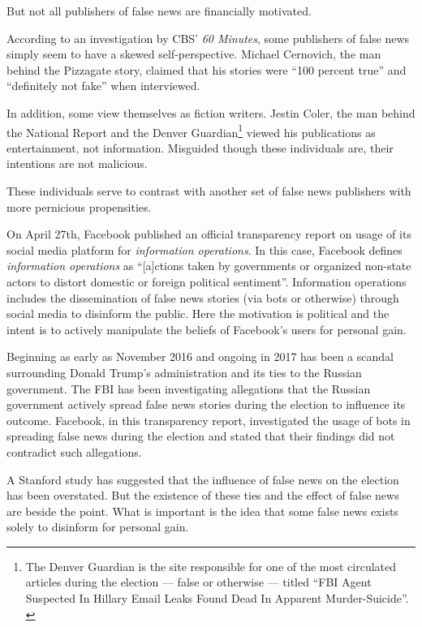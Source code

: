 \par But not all publishers of false news are financially motivated.
\par According to an investigation by CBS' \emph{60 Minutes}, some publishers of false news simply seem to have a skewed self-perspective. Michael Cernovich, the man behind the Pizzagate story, claimed that his stories were ``100 percent true'' and ``definitely not fake'' when interviewed. \cite{cbs_fn}
\par In addition, some view themselves as fiction writers. Jestin Coler, the man behind the National Report and the Denver Guardian\footnote{The Denver Guardian is the site responsible for one of the most circulated articles during the election --- false or otherwise --- titled ``FBI Agent Suspected In Hillary Email Leaks Found Dead In Apparent Murder-Suicide''. \cite{cbs_fn}} viewed his publications as entertainment, not information. \cite{cbs_fn} Misguided though these individuals are, their intentions are not malicious.
\par These individuals serve to contrast with another set of false news publishers with more pernicious propensities.

\label{info_ops}

\par On April 27th, Facebook published an official transparency report on usage of its social media platform for \emph{information operations}. In this case, Facebook defines \emph{information operations} as ``[a]ctions taken by governments or organized non-state actors to distort domestic or foreign political sentiment''. \cite{fb_info_ops} Information operations includes the dissemination of false news stories (via bots or otherwise) through social media to disinform the public. Here the motivation is political and the intent is to actively manipulate the beliefs of Facebook's users for personal gain.
\par Beginning as early as November 2016 and ongoing in 2017 has been a scandal surrounding Donald Trump's administration and its ties to the Russian government. \cite{wp_russia} The FBI has been investigating allegations that the Russian government actively spread false news stories during the election to influence its outcome. Facebook, in this transparency report, investigated the usage of bots in spreading false news during the election and stated that their findings did not contradict such allegations. \cite{fb_info_ops}
\par A Stanford study has suggested that the influence of false news on the election has been overstated. \cite{stanford_election} But the existence of these ties and the effect of false news are beside the point. What is important is the idea that some false news exists solely to disinform for personal gain.

